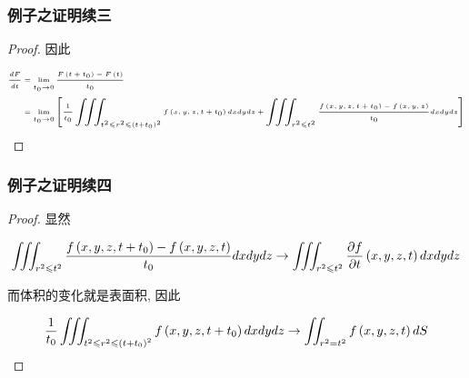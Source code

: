 \documentclass[aspectratio=2516]{beamer}
\begin{document}

\begin{frame}
\frametitle{\kaishu 例子之证明续三}

\kaishu

\begin{proof}
	
	\kaishu
	
	因此
	
	\begin{equation}
	\tiny 
	\begin{split}
	\frac{{dF}}{{dt}} & = \mathop {\lim }\limits_{{t_0} \to 0} \frac{{F\left( {t + {t_0}} \right) - F\left( t \right)}}{{{t_0}}}\\
	& = \mathop {\lim }\limits_{{t_0} \to 0} \left[ {\frac{1}{{{t_0}}}\iiint_{{t^2} \leqslant {r^2} \leqslant {{\left( {t + {t_0}} \right)}^2}} {f\left( {x,y,z,t + {t_0}} \right)dxdydz} + \iiint_{{r^2} \leqslant {t^2}} {\frac{{f\left( {x,y,z,t + {t_0}} \right) - f\left( {x,y,z} \right)}}{{{t_0}}}dxdydz}} \right]
	\end{split}
	\notag 
	\end{equation}
	
\end{proof}



\end{frame}


\begin{frame}
\frametitle{\kaishu 例子之证明续四}

\kaishu

\begin{proof}
	
	\kaishu
	
	显然
	
	\begin{equation}
	\iiint_{{r^2} \leqslant {t^2}} {\frac{{f\left( {x,y,z,t + {t_0}} \right) - f\left( {x,y,z,t} \right)}}{{{t_0}}}dxdydz} \to \iiint_{{r^2} \leqslant {t^2}} {\frac{{\partial f}}{{\partial t}}\left( {x,y,z,t} \right)dxdydz}
	\notag 
	\end{equation}
	
	而体积的变化就是表面积, 因此
	
	\begin{equation}
	\frac{1}{{{t_0}}}\iiint_{{t^2} \leqslant {r^2} \leqslant {{\left( {t + {t_0}} \right)}^2}} {f\left( {x,y,z,t + {t_0}} \right)dxdydz} \to \iint_{{r^2} = {t^2}} {f\left( {x,y,z,t} \right)dS}
	\notag 
	\end{equation}
	
\end{proof}



\end{frame}
\end{document}
